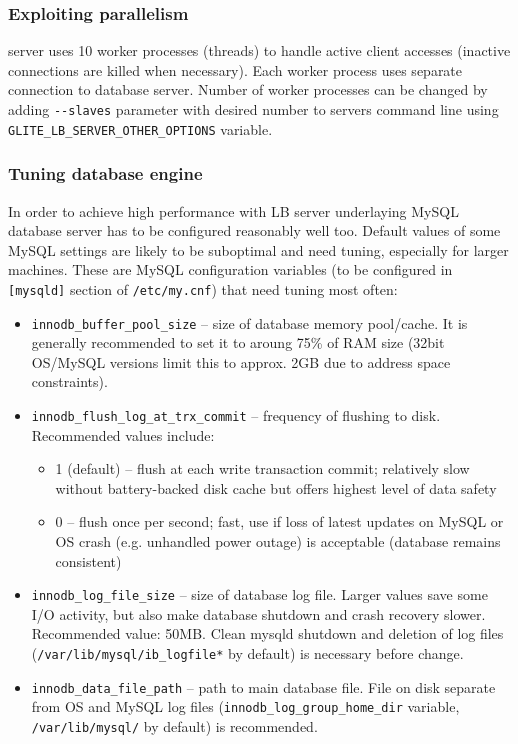 \subsubsection{Exploiting parallelism}

\LB server uses 10 worker processes (threads) to handle active client accesses (inactive connections are killed
when necessary). Each worker process uses separate connection to database server. Number of worker processes 
can be changed by adding \verb'--slaves' parameter with desired number to servers command line
using \verb'GLITE_LB_SERVER_OTHER_OPTIONS' variable.

\subsubsection{Tuning database engine}
\label{inst:db_tuning}

In order to achieve high performance with LB server underlaying MySQL 
database server has to be configured reasonably well too. 
Default values of some MySQL settings are likely to be suboptimal
and need tuning, especially for larger machines.
These are MySQL configuration variables (to be configured in \texttt{[mysqld]} 
section of \texttt{/etc/my.cnf}) that need tuning most often:
\begin{itemize}
\item \texttt{innodb\_buffer\_pool\_size} -- size of database memory pool/cache. 
It is generally recommended to set it to aroung 75\% of RAM size
(32bit OS/MySQL versions limit this to approx. 2GB due to address space 
constraints).

\item \texttt{innodb\_flush\_log\_at\_trx\_commit} -- frequency of flushing to disk.
Recommended values include:
\begin{itemize}
\item 1 (default) -- flush at each write transaction commit; relatively
slow without battery-backed disk cache but offers highest level of data safety
\item 0 -- flush once per second; fast, use if loss of latest updates on MySQL
or OS crash (e.g. unhandled power outage) is acceptable (database remains consistent)
\end{itemize}

\item \texttt{innodb\_log\_file\_size} -- size of database log file. Larger values
save some I/O activity, but also make database shutdown and crash recovery slower.
Recommended value: 50MB. Clean mysqld shutdown and deletion of log files 
(\texttt{/var/lib/mysql/ib\_logfile*} by default) is necessary before change.

\item \texttt{innodb\_data\_file\_path} -- path to main database file. File on
disk separate from OS and MySQL log files (\texttt{innodb\_log\_group\_home\_dir} variable,
\texttt{/var/lib/mysql/} by default) is recommended.

\end{itemize}

